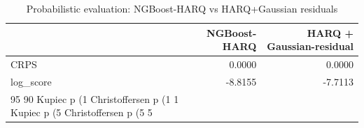 \begin{table}
\caption{Probabilistic evaluation: NGBoost-HARQ vs HARQ+Gaussian residuals}
\label{tab:table3_probabilistic}
\begin{tabular}{lrr}
\toprule
 & NGBoost-HARQ & HARQ + Gaussian-residual \\
\midrule
CRPS & 0.0000 & 0.0000 \\
log_score & -8.8155 & -7.7113 \\
95%
90%
Kupiec p (1%
Christoffersen p (1%
1%
Kupiec p (5%
Christoffersen p (5%
5%
\bottomrule
\end{tabular}
\end{table}
